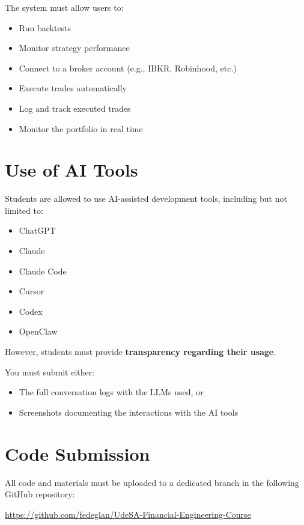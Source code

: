 \documentclass[12pt]{article}
\begin{document}
\begin{enumerate}[label=\arabic*.]
The system must allow users to:

\begin{itemize}
\item Run backtests
\item Monitor strategy performance
\item Connect to a broker account (e.g., IBKR, Robinhood, etc.)
\item Execute trades automatically
\item Log and track executed trades
\item Monitor the portfolio in real time
\end{itemize}

\end{enumerate}

\section*{Use of AI Tools}

\noindent Students are allowed to use AI-assisted development tools, including but not
limited to:

\begin{itemize}
\item ChatGPT
\item Claude
\item Claude Code
\item Cursor
\item Codex
\item OpenClaw
\end{itemize}

\noindent However, students must provide \textbf{transparency regarding their usage}.

You must submit either:

\begin{itemize}
\item The full conversation logs with the LLMs used, or
\item Screenshots documenting the interactions with the AI tools
\end{itemize}

\section*{Code Submission}

\noindent All code and materials must be uploaded to a dedicated branch in the
following GitHub repository:

\begin{center}
\url{https://github.com/fedeglan/UdeSA-Financial-Engineering-Course}
\end{center}
\end{document}
